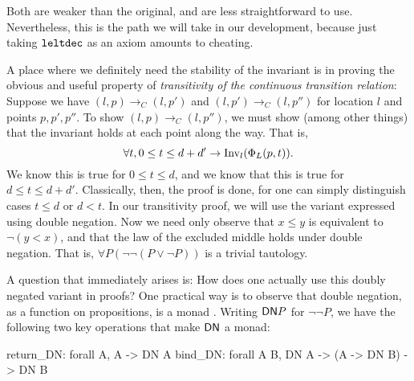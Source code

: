 \documentclass[runningheads]{llncs}
\newcommand{\Exists}[2]{\exists_{#1} \, . \, #2}
\newcommand{\DN}{{\sf DN}}
\newcommand{\IR}{{\mathbf R}}
\newcommand{\Inv}{{\rm Inv}}
\newcommand{\contrans}{\rightarrow_C}
\newcommand{\Dur}{{\IR_{\geq 0}}}
\newcommand{\leltdec}{{\tt leltdec}}
\begin{document}
Both are weaker than the original, and are less straightforward to
use. Nevertheless, this is the path we will take in our development,
because just taking $\leltdec$ as an axiom amounts to cheating.
 
A place where we definitely need the stability of the invariant is in
proving the obvious and useful property of {\em transitivity of the
  continuous transition relation}: Suppose we have $(l, p) \contrans
(l, p')$ and $(l, p')\contrans (l, p'')$ for location $l$ and points
$p, p', p''$. 
To show $(l, p)\contrans (l, p'')$, we must show (among other things)
that the invariant holds at each point along the way. That is,
$$\forall t, 0 \leq t \leq d + d' \rightarrow \Inv_l( \Phi_L(p, t)).$$
We know this is true for $0 \leq t \leq d$, and we know that this is
true for $d \leq t \leq d + d'$. Classically, then, the proof is done,
for one can simply distinguish cases $t \leq d$ or $d < t$.  In our
transitivity proof, we will use the variant expressed using double
negation. Now we need only observe that $x \leq y$ is equivalent to $\neg(y < x)$, and that the law of the excluded middle holds under double negation. That is,
$\forall P( \neg  \neg  (P \vee \neg  P))$
is a trivial tautology.

A question that immediately arises is: How does one actually use this
doubly negated variant in proofs?  One practical way is to observe
that double negation, as a function on propositions, is a monad
\cite{wadler95monads}. Writing $\DN P$ for $\neg  \neg  P$, we have the following two key
operations that make $\DN$ a monad:

\begin{code}
  return_DN: forall A, A -> DN A
  bind_DN: forall A B, DN A -> (A -> DN B) -> DN B
\end{code}
\end{document}

